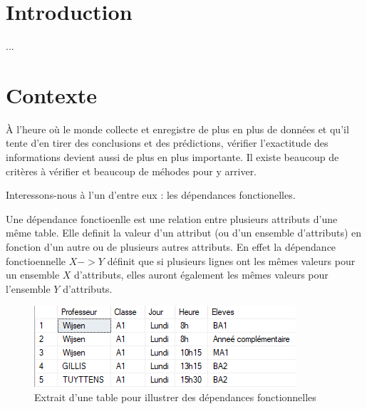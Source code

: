 \documentclass[12pt, a4paper, oneside, titlepage]{book}%
\begin{document}
\newpage
\pagestyle{fancy}  %
\mainmatter  %
\chapter{Introduction}\label{CHintro}
...
\vspace*{20mm}


\cleardoublepage %
\chapter{Contexte}\label{CHcontexte}
\`{A} l'heure où le monde collecte et enregistre de plus en plus de données et qu'il tente d'en tirer des conclusions et des prédictions, vérifier l'exactitude des informations devient aussi de plus en plus importante. Il existe beaucoup de critères à vérifier et beaucoup de méhodes pour y arriver.

Interessons-nous à l'un d'entre eux : les dépendances fonctionelles.

Une dépendance fonctioenlle est une relation entre plusieurs attributs d'une même table. Elle definit la valeur d'un attribut (ou d'un ensemble d'attributs) en fonction d'un autre ou de plusieurs autres attributs. En effet la dépendance fonctioennelle $X->Y$ définit que si plusieurs lignes ont les mêmes valeurs pour un ensemble $X$ d'attributs, elles auront également les mêmes valeurs pour l'ensemble $Y$ d'attributs.

\begin{figure}[ht]
	\center
	\includegraphics{DF.png}
	\caption{\label{picDF} Extrait d'une table pour illustrer des dépendances fonctionnelles}
\end{figure}
\end{document}

